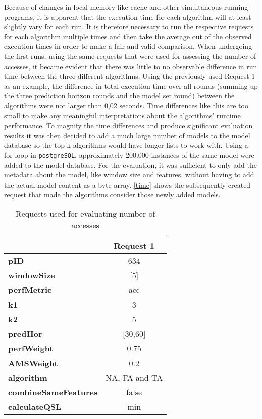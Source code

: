 Because of changes in local memory like cache and other simultaneous running programs, it is apparent that the execution time for each algorithm will at least slightly vary for each run. It is therefore necessary to run the respective requests for each algorithm multiple times and then take the average out of the observed execution times in order to make a fair and valid comparison. When undergoing the first runs, using the same requests that were used for assessing the number of accesses, it became evident that there was little to no observable difference in run time between the three different algorithms. Using the previously used Request 1 as an example, the difference in total execution time over all rounds (summing up the three prediction horizon rounds and the model set round) between the algorithms were not larger than 0,02 seconds. Time differences like this are too small to make any meaningful interpretations about the algorithms’ runtime performance. To magnify the time differences and produce significant evaluation results it was then decided to add a much large number of models to the model database so the top-k algorithms would have longer lists to work with. Using a for-loop in \texttt{postgreSQL}, approximately 200.000 instances of the same model were added to the model database. For the evaluation, it was sufficient to only add the metadata about the model, like window size and features, without having to add the actual model content as a byte array. \autoref{time} shows the subsequently created request that made the algorithms consider those newly added models.



\begin{table}[h]
\centering
    \begin{tabular}{ l | c}
        \toprule
        &
\textbf{Request 1}      
 \\\midrule

\textbf{pID} & 634 \\\midrule
\textbf{windowSize} & [5] \\\midrule
\textbf{perfMetric} & acc  \\\midrule
\textbf{k1} & 3\\\midrule
\textbf{k2} & 5 \\\midrule
\textbf{predHor} & [30,60]\\\midrule
\textbf{perfWeight} & 0.75 \\\midrule
\textbf{AMSWeight} & 0.2\\\midrule
\textbf{algorithm}  & NA, FA and TA  \\\midrule
\textbf{combineSameFeatures} & false \\\midrule
\textbf{calculateQSL} & min \\
        \bottomrule
    \end{tabular}
\caption{Requests used for evaluating number of accesses} \label{time}
\end{table}


